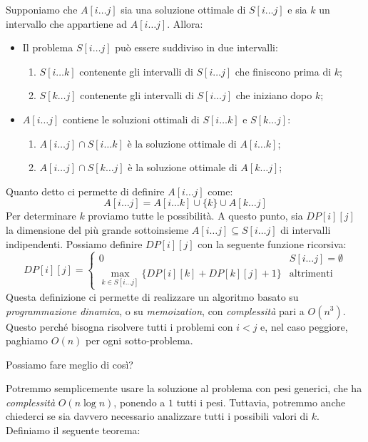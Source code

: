 \begin{definition}
    Supponiamo che $A[i\dots j]$ sia una soluzione ottimale di $S[i\dots j]$
    e sia $k$ un intervallo che appartiene ad $A[i\dots j]$. Allora:
    \begin{itemize}
        \item Il problema $S[i\dots j]$ può essere suddiviso in due intervalli:
        \begin{enumerate}
            \item $S[i\dots k]$ contenente gli intervalli di $S[i\dots j]$ che
            finiscono prima di $k$;
            \item $S[k\dots j]$ contenente gli intervalli di $S[i\dots j]$ che
            iniziano dopo $k$;
        \end{enumerate}
        \item $A[i\dots j]$ contiene le soluzioni ottimali di $S[i\dots k]$ e
        $S[k\dots j]$:
        \begin{enumerate}
            \item $A[i\dots j]\cap S[i\dots k]$ è la soluzione ottimale di $A[i\dots k]$;
            \item $A[i\dots j]\cap S[k\dots j]$ è la soluzione ottimale di $A[k\dots j]$;
        \end{enumerate}
    \end{itemize}
\end{definition}

\noindent
Quanto detto ci permette di definire $A[i\dots j]$ come:
\[A[i\dots j]=A[i\dots k]\cup\{k\}\cup A[k\dots j]\]
Per determinare $k$ proviamo tutte le possibilità. A questo punto, sia $DP[i][j]$
la dimensione del più grande sottoinsieme $A[i\dots j]\subseteq S[i\dots j]$ di
intervalli indipendenti. Possiamo definire $DP[i][j]$ con la seguente funzione
ricorsiva:
\[DP[i][j]=\begin{cases}
    0 & S[i\dots j]=\emptyset\\
    \max_{k\in S[i\dots j]}\{DP[i][k]+DP[k][j]+1\} & \text{altrimenti}
\end{cases}\]
Questa definizione ci permette di realizzare un algoritmo basato su
\emph{programmazione dinamica}, o su \emph{memoization}, con \emph{complessità}
pari a $O(n^3)$. Questo perché bisogna risolvere tutti i problemi con $i<j$ e,
nel caso peggiore, paghiamo $O(n)$ per ogni sotto-problema.

\bigskip\noindent
Possiamo fare meglio di così?

Potremmo semplicemente usare la soluzione al problema con pesi generici, che
ha \emph{complessità} $O(n\log n)$, ponendo a $1$ tutti i pesi. Tuttavia,
potremmo anche chiederci se sia davvero necessario analizzare tutti i
possibili valori di $k$. Definiamo il seguente teorema:

